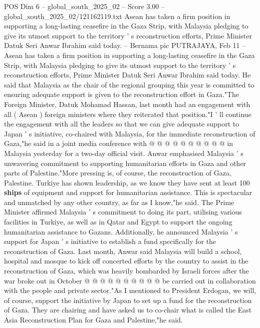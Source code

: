 \begin{textsample}{POS Dim 6 – global\_south\_2025\_02 – Score 3.00 – global\_south\_2025\_02/121162119.txt}  \label{ex:f6_pos_403}
Asean has taken a firm position in supporting a long-lasting ceasefire in the Gaza Strip, with Malaysia pledging to give its utmost support to the territory ' s reconstruction efforts, Prime Minister Datuk Seri Anwar Ibrahim said today. -- Bernama pic PUTRAJAYA, Feb 11 -- Asean has taken a firm position in supporting a long-lasting ceasefire in the Gaza Strip, with Malaysia pledging to give its utmost support to the territory ' s reconstruction efforts, Prime Minister Datuk Seri Anwar Ibrahim said today.
He said that Malaysia as the chair of the regional grouping this year is committed to ensuring adequate support is given to the reconstruction effort in Gaza."The Foreign Minister, Datuk Mohamad Hassan, last month had an engagement with all ( Asean ) foreign ministers where they reiterated that position."I ' ll continue the engagement with all the leaders so that we can give adequate support to Japan ' s initiative, co-chaired with Malaysia, for the immediate reconstruction of Gaza,"he said in a joint media conference with @ @ @ @ @ @ @ @ @ @ in Malaysia yesterday for a two-day official visit.
Anwar emphasised Malaysia ' s unwavering commitment to supporting humanitarian efforts in Gaza and other parts of Palestine."More pressing is, of course, the reconstruction of Gaza, Palestine.
Turkiye has shown leadership, as we know they have sent at least 100 \textbf{ships} of equipment and support for humanitarian assistance.
This is spectacular and unmatched by any other country, as far as I know,"he said.
The Prime Minister affirmed Malaysia ' s commitment to doing its part, utilising various facilities in Turkiye, as well as in Qatar and Egypt to support the ongoing humanitarian assistance to Gazans.
Additionally, he announced Malaysia ' s support for Japan ' s initiative to establish a fund specifically for the reconstruction of Gaza.
Last month, Anwar said Malaysia will build a school, hospital and mosque to kick off concerted efforts by the country to assist in the reconstruction of Gaza, which was heavily bombarded by Israeli forces after the war broke out in October @ @ @ @ @ @ @ @ @ @ be carried out in collaboration with the people and private sector."As I mentioned to President Erdogan, we will, of course, support the initiative by Japan to set up a fund for the reconstruction of Gaza.
They are chairing and have asked us to co-chair what is called the East Asia Reconstruction Plan for Gaza and Palestine,"he said.

\end{textsample}
